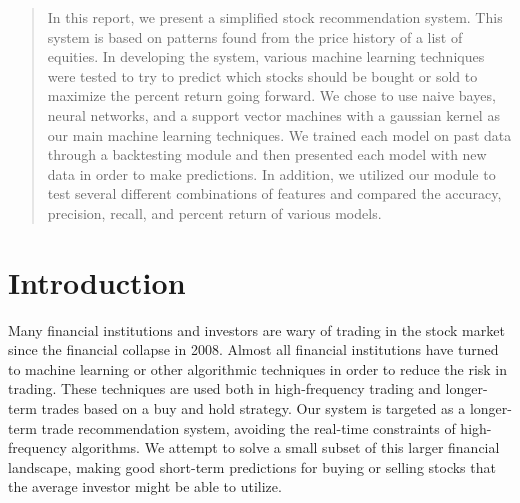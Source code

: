 \documentclass{article}
\begin{document}

\begin{abstract}
In this report, we present a simplified stock recommendation system. This system is based on patterns found from the price history of a list of equities. In developing the system, various machine learning techniques were tested to try to predict which stocks should be bought or sold to maximize the percent return going forward. We chose to use naive bayes, neural networks, and a support vector machines with a gaussian kernel as our main machine learning techniques. We trained each model on past data through a backtesting module and then presented each model with new data in order to make predictions. In addition, we utilized our module to test several different combinations of features and compared the accuracy, precision, recall, and percent return of various models.
\end{abstract}

\section{Introduction}
Many financial institutions and investors are wary of trading in the stock market since the financial collapse in 2008.  Almost all financial institutions have turned to machine learning or other algorithmic techniques in order to reduce the risk in trading. These techniques are used both in high-frequency trading and longer-term trades based on a buy and hold strategy. Our system is targeted as a longer-term trade recommendation system, avoiding the real-time constraints of high-frequency algorithms. We attempt to solve a small subset of this larger financial landscape, making good short-term predictions for buying or selling stocks that the average investor might be able to utilize.
\end{document}
